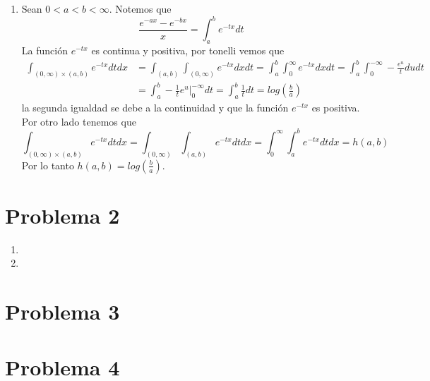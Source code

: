 \documentclass{article}
\begin{document}
\begin{enumerate}
    \item Sean $0<a<b<\infty$. Notemos que
    \begin{equation*}
        \frac{e^{-ax}-e^{-bx}}{x}=\int_{a}^{b}e^{-tx}dt
    \end{equation*}
    La función $e^{-tx}$ es continua y positiva, por tonelli vemos que
    \begin{align*}
        \int_{(0,\infty)\times(a,b)}e^{-tx}dtdx &= \int_{(a,b)}\int_{(0,\infty)}e^{-tx}dxdt
        =\int_{a}^{b}\int_{0}^{\infty}e^{-tx}dxdt=\int_{a}^{b}\int_{0}^{-\infty}-\frac{e^{u}}{t}
        dudt \\[2mm]
        &= \int_{a}^{b}-\frac{1}{t}e^{u}\Big|_{0}^{-\infty}dt=\int_{a}^{b}\frac{1}{t}dt
        =log\left(\frac{b}{a}\right)
    \end{align*}
    la segunda igualdad se debe a la continuidad y que la función $e^{-tx}$ es positiva. 
    Por otro lado tenemos que
    \begin{equation*}
        \int_{(0,\infty)\times(a,b)}e^{-tx}dtdx=\int_{(0,\infty)}\int_{(a,b)}e^{-tx}dtdx
        =\int_{0}^{\infty}\int_{a}^{b}e^{-tx}dtdx=h(a,b)
    \end{equation*}
    Por lo tanto $h(a,b)=log\left(\frac{b}{a}\right)$.
\end{enumerate}

\section*{Problema 2}
\begin{enumerate}
    \item 
    \item 
\end{enumerate}

\section*{Problema 3}

\section*{Problema 4}
\end{document}
